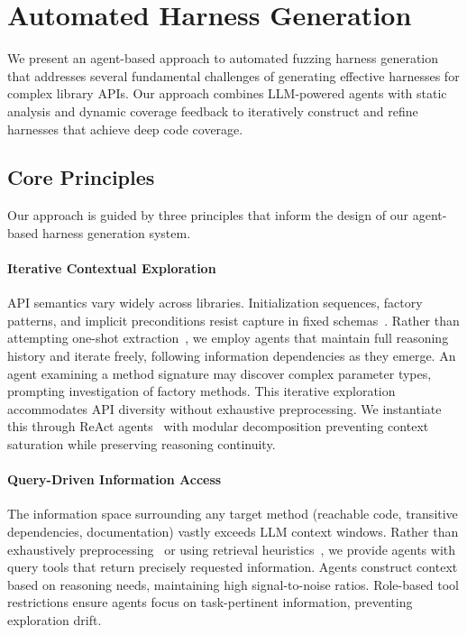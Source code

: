 \section{Automated Harness Generation}%
\label{sec:approach}

We present an agent-based approach to automated fuzzing harness generation that addresses several fundamental challenges of generating effective harnesses for complex library APIs. Our approach combines LLM-powered agents with static analysis and dynamic coverage feedback to iteratively construct and refine harnesses that achieve deep code coverage.

\subsection{Core Principles}%
\label{subsec:core-principles}
Our approach is guided by three principles that inform the design of our agent-based harness generation system.
\paragraph{Iterative Contextual Exploration}
API semantics vary widely across libraries. Initialization sequences, factory patterns, and implicit preconditions resist capture in fixed schemas~\cite{CITE:template-based-test-gen}. Rather than attempting one-shot extraction~\cite{CITE:one-shot-LLM-generation}, we employ agents that maintain full reasoning history and iterate freely, following information dependencies as they emerge. An agent examining a method signature may discover complex parameter types, prompting investigation of factory methods. This iterative exploration accommodates API diversity without exhaustive preprocessing. We instantiate this through ReAct agents~\cite{yao2023react} with modular decomposition preventing context saturation while preserving reasoning continuity.

\paragraph{Query-Driven Information Access}
The information space surrounding any target method (reachable code, transitive dependencies, documentation) vastly exceeds LLM context windows. Rather than exhaustively preprocessing~\cite{CITE:static-analysis-preprocessing} or using retrieval heuristics~\cite{CITE:RAG-for-code}, we provide agents with query tools that return precisely requested information. Agents construct context based on reasoning needs, maintaining high signal-to-noise ratios. Role-based tool restrictions ensure agents focus on task-pertinent information, preventing exploration drift.

